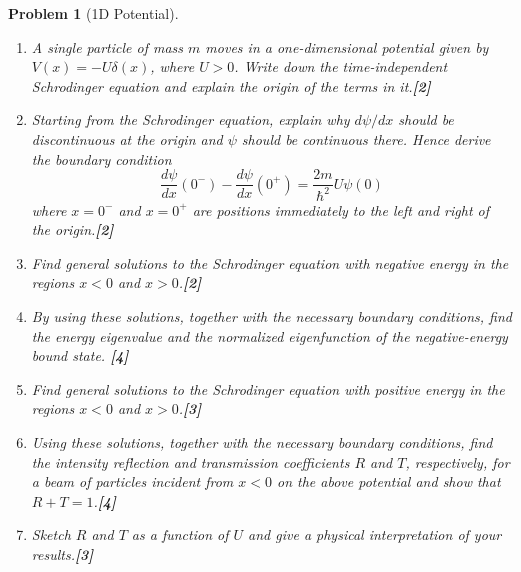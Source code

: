 \documentclass[a4paper]{article}
\theoremstyle{new}
\newtheorem{qns}{Problem}[subsection]
\begin{document}
\begin{qns}[1D Potential]\leavevmode
\begin{enumerate}[label=(\roman*)]
\item A single particle of mass $m$ moves in a one-dimensional potential given by $V(x) = −U\delta(x)$, where $U > 0$. Write down the time-independent Schrodinger equation and explain the origin of the terms in it.\hfill\textbf{[2]}
\item Starting from the Schrodinger equation, explain why $d\psi/dx$ should be discontinuous at the origin and $\psi$ should be continuous there. Hence derive the boundary condition
$$\frac{d\psi}{dx}(0^-)-\frac{d\psi}{dx}(0^+)=\frac{2m}{\hbar^2}U\psi(0)$$
where $x = 0^−$ and $x = 0^+$ are positions immediately to the left and right of the origin.\hfill\textbf{[2]}
\item Find general solutions to the Schrodinger equation with negative energy in the regions $x < 0$ and $x > 0$.\hfill\textbf{[2]}
\item By using these solutions, together with the necessary boundary conditions, find the energy eigenvalue and the normalized eigenfunction of the negative-energy bound state. \hfill\textbf{[4]}
\item Find general solutions to the Schrodinger equation with positive energy in the regions $x < 0$ and $x > 0$.\hfill\textbf{[3]}
\item Using these solutions, together with the necessary boundary conditions, find the intensity reflection and transmission coefficients $R$ and $T$, respectively, for a beam of particles incident from $x < 0$ on the above potential and show that $R + T = 1$.\hfill\textbf{[4]}
\item Sketch $R$ and $T$ as a function of $U$ and give a physical interpretation of your results.\hfill\textbf{[3]}
\end{enumerate}
\end{qns}
\end{document}

